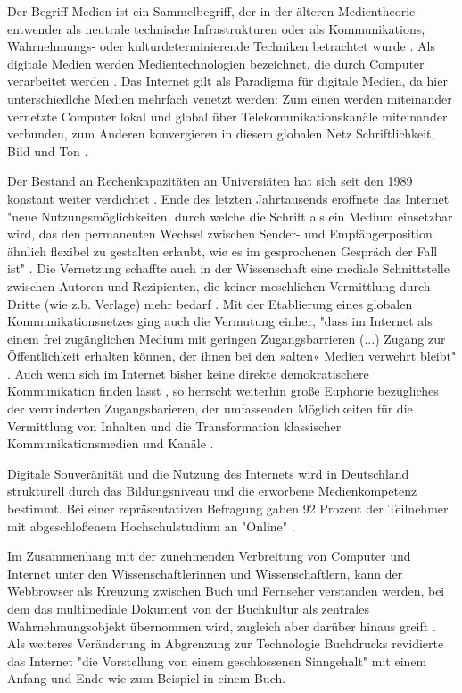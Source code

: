 Der Begriff Medien ist ein Sammelbegriff, der in der älteren Medientheorie entwender als neutrale technische Infrastrukturen oder als Kommunikations, Wahrnehmungs- oder kulturdeterminierende Techniken betrachtet wurde \cite{beck2005_Kommunikation}. Als digitale Medien werden Medientechnologien bezeichnet, die durch Computer verarbeitet werden \cite{nunning_2013_metzler}. Das Internet gilt als Paradigma für digitale Medien, da hier unterschiedlche Medien mehrfach venetzt werden: Zum einen werden miteinander vernetzte Computer lokal und global über Telekomunikationskanäle miteinander verbunden, zum Anderen konvergieren in diesem globalen Netz Schriftlichkeit, Bild und Ton \cite{nunning_2013_metzler}.

Der Bestand an Rechenkapazitäten an Universiäten hat sich seit den 1989 konstant weiter verdichtet \cite{Rutenfranz_1997}. Ende des letzten Jahrtausends eröffnete das Internet "neue Nutzungsmöglichkeiten, durch welche die Schrift als ein Medium einsetzbar wird, das den permanenten Wechsel zwischen Sender- und Empfängerposition ähnlich flexibel zu gestalten erlaubt, wie es im gesprochenen Gespräch der Fall ist" \cite{sandbothe_2000_pragmatische}. Die Vernetzung schaffte auch in der Wissenschaft eine mediale Schnittstelle zwischen Autoren und Rezipienten, die keiner meschlichen Vermittlung durch Dritte (wie z.b. Verlage) mehr bedarf \cite{naeder_2010_open}. Mit der Etablierung eines globalen Kommunikationsnetzes ging auch die Vermutung einher, "dass im Internet als einem frei zugänglichen Medium mit geringen Zugangsbarrieren (...) Zugang zur Öffentlichkeit erhalten können, der ihnen bei den »alten« Medien verwehrt bleibt" \cite{Gerhards_2007}. Auch wenn sich im Internet bisher keine direkte demokratischere Kommunikation finden lässt \cite{Gerhards_2007}, so herrscht weiterhin große Euphorie bezügliches der verminderten Zugangsbarieren, der umfassenden Möglichkeiten für die Vermittlung von Inhalten und die Transformation klassischer Kommunikationsmedien und Kanäle \cite{suchen}.

Digitale Souveränität und die Nutzung des Internets wird in Deutschland strukturell durch das Bildungsniveau und die erworbene Medienkompetenz bestimmt. Bei einer repräsentativen Befragung gaben 92 Prozent der Teilnehmer mit abgeschloßenem Hochschulstudium an "Online" \cite{nonliner_2014}.

Im Zusammenhang mit der zunehmenden Verbreitung von Computer und Internet unter den Wissenschaftlerinnen und Wissenschaftlern, kann der Webbrowser als Kreuzung zwischen Buch und Fernseher verstanden werden, bei dem das multimediale Dokument von der Buchkultur als zentrales Wahrnehmungsobjekt übernommen wird, zugleich aber darüber hinaus greift \cite{Warnke_2011}. Als weiteres Veränderung in Abgrenzung zur Technologie Buchdrucks revidierte das Internet "die Vorstellung von einem geschlossenen Sinngehalt" \cite{sandbothe_2000_pragmatische} mit einem Anfang und Ende wie zum Beispiel in einem Buch.

